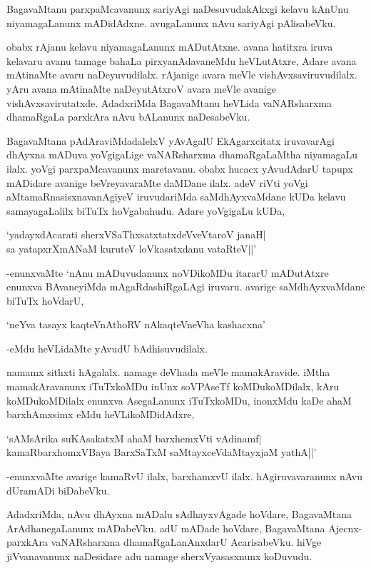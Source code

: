 BagavaMtanu parxpaMcavanunx sariyAgi naDesuvudakAkxgi kelavu kAnUnu niyamagaLanunx mADidAdxne. avugaLanunx nAvu sariyAgi pAlisabeVku.

obabx rAjanu kelavu niyamagaLanunx mADutAtxne. avana hatitxra iruva kelavaru avanu tamage bahaLa pirxyanAdavaneMdu heVLutAtxre, Adare avana mAtinaMte avaru naDeyuvudilalx. rAjanige avara meVle vishAvxsaviruvudilalx. yAru avana mAtinaMte naDeyutAtxroV avara meVle avanige vishAvxsavirutatxde. AdadxriMda BagavaMtanu heVLida vaNARsharxma dhamaRgaLa parxkAra nAvu bALanunx naDesabeVku.

BagavaMtana pAdAraviMdadalelxV yAvAgalU EkAgarxcitatx iruvavarAgi dhAyxna mADuva yoVgigaLige vaNARsharxma dhamaRgaLaMtha niyamagaLu ilalx. yoVgi parxpaMcavanunx maretavanu. obabx hucacx yAvudAdarU tapupx mADidare avanige beVreyavaraMte daMDane ilalx. adeV riVti yoVgi aMtamaRnasisxnavanAgiyeV iruvudariMda saMdhAyxvaMdane kUDa kelavu samayagaLalilx biTuTx hoVgabahudu. Adare yoVgigaLu kUDa,

\begin{shloka}
`yadayxdAcarati sherxVSaThxsatxtatxdeVveVtaroV janaH|\\
sa yatapxrXmANaM kuruteV loVkasatxdanu vataRteV||'
\end{shloka}

-enunxvaMte `nAnu mADuvudanunx noVDikoMDu itararU mADutAtxre enunxva BAvaneyiMda mAgaRdashiRgaLAgi iruvaru. avarige saMdhAyxvaMdane biTuTx hoVdarU,

\begin{shloka}
`neYva tasayx kaqteVnAthoRV nAkaqteVneVha kashacxna'
\end{shloka}

-eMdu heVLidaMte yAvudU bAdhisuvudilalx.

namamx sithxti hAgalalx. namage deVhada meVle mamakAravide. iMtha mamakAravanunx iTuTxkoMDu inUnx soVPAseTf koMDukoMDilalx, kAru koMDukoMDilalx enunxva AsegaLanunx iTuTxkoMDu, inonxMdu kaDe ahaM barxhAmxsimx eMdu heVLikoMDidAdxre, 

\begin{shloka}
`sAMsArika suKAsakatxM ahaM barxhemxVti vAdinamf|\\
kamaRbarxhomxV\s Baya BarxSaTxM saMtayxceVdaMtayxjaM yathA||'
\end{shloka}

-enunxvaMte avarige kamaRvU ilalx, barxhamxvU ilalx. hAgiruvavaranunx nAvu dUramADi biDabeVku.

AdadxriMda, nAvu dhAyxna mADalu sAdhayxvAgade hoVdare, BagavaMtana ArAdhanegaLanunx mADabeVku. adU mADade hoVdare, BagavaMtana Ajecnx-parxkAra vaNARsharxma dhamaRgaLanAnxdarU AcarisabeVku. hiVge jiVvanavanunx naDesidare adu namage sherxVyasasxnunx koDuvudu.


\endchapter
